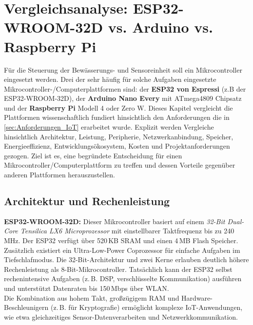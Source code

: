 \section{Vergleichsanalyse: ESP32-WROOM-32D vs. Arduino vs. Raspberry Pi}

Für die Steuerung der Bewässerungs- und Sensoreinheit soll ein Mikrocontroller eingesetzt werden. Drei der sehr häufig für solche Aufgaben eingesetzte Mikrocontroller-/Computerplattformen sind: der \textbf{ESP32 von Espressi} (z.B der ESP32-WROOM-32D), der \textbf{Arduino Nano Every} mit ATmega4809 Chipsatz und der \textbf{Raspberry Pi} Modell 4 oder Zero W. Dieses Kapitel vergleicht die Plattformen wissenschaftlich fundiert hinsichtlich den Anforderungen die in \autoref{sec:Anforderungen_IoT} erarbeitet wurde. Explizit werden Vergleiche hinsichtlich Architektur, Leistung, Peripherie, Netzwerkanbindung, Speicher, Energieeffizienz, Entwicklungsökosystem, Kosten und Projektanforderungen gezogen. Ziel ist es, eine begründete Entscheidung für einen Mikrocontroller/Computerplattform zu treffen und dessen Vorteile gegenüber anderen Plattformen herauszustellen.


\subsection{Architektur und Rechenleistung}

\textbf{ESP32-WROOM-32D:} Dieser Mikrocontroller basiert auf einem \textit{32-Bit Dual-Core Tensilica LX6 Microprozessor} mit einstellbarer Taktfrequenz bis zu 240\,MHz. Der ESP32 verfügt über 520\,KB SRAM und einen 4\,MB Flash Speicher. \autocite{esp32_comparison} Zusätzlich existiert ein Ultra-Low-Power Coprozessor für einfache Aufgaben im Tiefschlafmodus. Die 32-Bit-Architektur und zwei Kerne erlauben deutlich höhere Rechenleistung als 8-Bit-Mi\-kro\-con\-trol\-ler. Tatsächlich kann der ESP32 selbst rechenintensive Aufgaben (z.\,B. DSP, verschlüsselte Kommunikation) ausführen und unterstützt Datenraten bis 150\,Mbps über WLAN. 
\\
Die Kombination aus hohem Takt, großzügigem RAM und Hardware-Beschleunigern (z.\,B. für Kryptografie) ermöglicht komplexe IoT-Anwendungen, wie etwa gleichzeitiges Sensor-Datenverarbeiten und Netzwerkkommunikation. \autocite{esp_datasheet}

\vspace{5mm}

